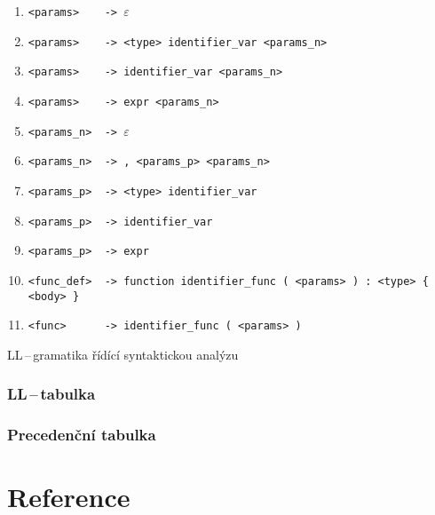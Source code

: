 \documentclass[a4paper,12pt]{article}
\begin{document}
\begin{table}[!ht]
\begin{enumerate}[noitemsep]
		\item \verb|<params>    -> |$\varepsilon$
		\item \verb|<params>    -> <type> identifier_var <params_n>|
		\item \verb|<params>    -> identifier_var <params_n>|
		\item \verb|<params>    -> expr <params_n>|
		\item \verb|<params_n>  -> |$\varepsilon$
		\item \verb|<params_n>  -> , <params_p> <params_n>|
		      		      
		\item \verb|<params_p>  -> <type> identifier_var|
		\item \verb|<params_p>  -> identifier_var|
		\item \verb|<params_p>  -> expr|
		      		         
		\item \verb|<func_def>  -> function identifier_func ( <params> ) : <type> { <body> }|
		\item \verb|<func>      -> identifier_func ( <params> )|
		      		         
	\end{enumerate}
	\caption{LL\,--\,gramatika řídící syntaktickou analýzu}
	\label{table:ll-gramatika}
\end{table}
\clearpage
  
\subsubsection{LL\,--\,tabulka}

\subsubsection{Precedenční tabulka}

\section{Reference}
\end{document}
